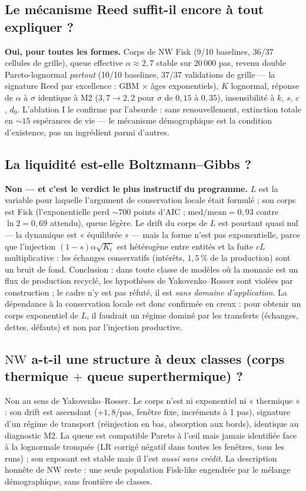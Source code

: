 \documentclass[11pt,a4paper]{article}
\newcommand{\NW}{\mathrm{NW}}
\begin{document}
\subsection{Le mécanisme Reed suffit-il encore à tout expliquer ?}
\textbf{Oui, pour toutes les formes.} Corps de $\NW$ Fisk (9/10 baselines,
36/37 cellules de grille), queue effective $\alpha \approx 2{,}7$ stable
sur $20\,000$ pas, revenu double Pareto-lognormal \emph{partout} (10/10
baselines, 37/37 validations de grille — la signature Reed par excellence :
GBM $\times$ âges exponentiels), $K$ lognormal, réponse de $\alpha$ à
$\sigma$ identique à M2 ($3{,}7 \to 2{,}2$ pour $\sigma$ de $0{,}15$ à
$0{,}35$), insensibilité à $k$, $s$, $c$, $d_0$. L'ablation I le confirme
par l'absurde : sans renouvellement, extinction totale en $\sim 15$
espérances de vie — le mécanisme démographique est la condition
d'existence, pas un ingrédient parmi d'autres.

\subsection{La liquidité est-elle Boltzmann--Gibbs ?}
\textbf{Non — et c'est le verdict le plus instructif du programme.} $L$
est la variable pour laquelle l'argument de conservation locale était
formulé ; son corps est Fisk (l'exponentielle perd $\sim 700$ points
d'AIC ; $\mathrm{med/mean} = 0{,}93$ contre $\ln 2 = 0{,}69$ attendu),
queue légère. Le drift du corps de $L$ est pourtant quasi nul — la
dynamique est « équilibrée » — mais la forme n'est pas exponentielle,
parce que l'injection $(1-s)\alpha\sqrt{K_i}$ est hétérogène entre entités
et la fuite $cL$ multiplicative : les échanges conservatifs (intérêts,
$1{,}5\,\%$ de la production) sont un bruit de fond. Conclusion : dans
toute classe de modèles où la monnaie est un flux de production recyclé,
les hypothèses de Yakovenko--Rosser sont violées par construction ; le
cadre n'y est pas réfuté, il est \emph{sans domaine d'application}. La
dépendance à la conservation locale est donc confirmée en creux : pour
obtenir un corps exponentiel de $L$, il faudrait un régime dominé par les
transferts (échanges, dettes, défauts) et non par l'injection productive.

\subsection{$\NW$ a-t-il une structure à deux classes
(corps thermique $+$ queue superthermique) ?}
Non au sens de Yakovenko--Rosser. Le corps n'est ni exponentiel ni
« thermique » : son drift est ascendant ($+1{,}8$/pas, fenêtre fixe,
incréments à 1 pas), signature d'un régime de transport (réinjection en
bas, absorption aux bords), identique au diagnostic M2. La queue est
compatible Pareto à l'œil mais jamais identifiée face à la lognormale
tronquée (LR corrigé négatif dans toutes les fenêtres, tous les runs) ;
son exposant est stable mais il l'est \emph{aussi sans crédit}. La
description honnête de $\NW$ reste : une seule population Fisk-like
engendrée par le mélange démographique, sans frontière de classes.
\end{document}
